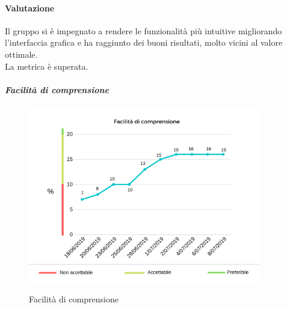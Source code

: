 	\paragraph*{Valutazione} Il gruppo si è  impegnato a rendere le funzionalità più  intuitive migliorando l'interfaccia grafica e ha raggiunto dei buoni risultati, molto vicini al valore ottimale.
	\\ La metrica è superata.
	\pagebreak
	\subparagraph{Facilità di comprensione}
	\begin{center}
		\begin{figure}[h] 
			\centering 
			\includegraphics[width=0.90\textwidth]{res/images/new/facilitaComprensione.png}\\
			\caption{Facilità di comprensione}
		\end{figure}
	\end{center}
